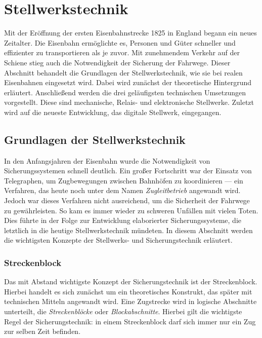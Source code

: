 \section{Stellwerkstechnik}\label{text:Grundlagen:Stellwerkstechnik}

Mit der Eröffnung der ersten Eisenbahnstrecke 1825 in England begann ein neues Zeitalter. Die Eisenbahn ermöglichte es, Personen und Güter schneller und effizienter zu transportieren als je zuvor. Mit zunehmendem Verkehr auf der Schiene stieg auch die Notwendigkeit der Sicherung der Fahrwege. Dieser Abschnitt behandelt die Grundlagen der Stellwerkstechnik, wie sie bei realen Eisenbahnen eingesetzt wird. Dabei wird zunächst der theoretische Hintergrund erläutert. Anschließend werden die drei geläufigsten technischen Umsetzungen vorgestellt. Diese sind mechanische, Relais- und elektronische Stellwerke. Zuletzt wird auf die neueste Entwicklung, das digitale Stellwerk, eingegangen.

\subsection{Grundlagen der Stellwerkstechnik}\label{text:Grundlagen:Stellwerkstechnik:Grundlagen-der-Stellwerkstechnik}

In den Anfangsjahren der Eisenbahn wurde die Notwendigkeit von Sicherungssystemen schnell deutlich. Ein großer Fortschritt war der Einsatz von Telegraphen, um Zugbewegungen zwischen Bahnhöfen zu koordinieren --- ein Verfahren, das heute noch unter dem Namen \textit{Zugleitbetrieb} angewandt wird. Jedoch war dieses Verfahren nicht ausreichend, um die Sicherheit der Fahrwege zu gewährleisten. So kam es immer wieder zu schweren Unfällen mit vielen Toten. Dies führte in der Folge zur Entwicklung elaborierter Sicherungssysteme, die letztlich in die heutige Stellwerkstechnik mündeten. In diesem Abschnitt werden die wichtigsten Konzepte der Stellwerks- und Sicherungstechnik erläutert.

\subsubsection*{Streckenblock}\label{text:Grundlagen:Stellwerkstechnik:Sicherung-des-Schienenverkehrs:Streckenblock}

Das mit Abstand wichtigste Konzept der Sicherungstechnik ist der Streckenblock. Hierbei handelt es sich zunächst um ein theoretisches Konstrukt, das später mit technischen Mitteln angewandt wird. Eine Zugstrecke wird in logische Abschnitte unterteilt, die \textit{Streckenblöcke} oder \textit{Blockabschnitte}. Hierbei gilt die wichtigste Regel der Sicherungstechnik: in einem Streckenblock darf sich immer nur ein Zug zur selben Zeit befinden.

